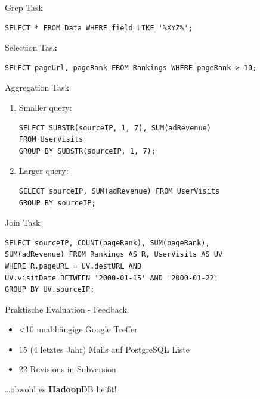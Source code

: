 \documentclass{beamer}
\begin{document}
\begin{frame}[fragile]{Grep Task}
\begin{verbatim}
SELECT * FROM Data WHERE field LIKE '%XYZ%';
\end{verbatim}
\end{frame}

\begin{frame}[fragile]{Selection Task}
\begin{verbatim}
SELECT pageUrl, pageRank FROM Rankings WHERE pageRank > 10;
\end{verbatim}
\end{frame}

\begin{frame}[fragile]{Aggregation Task}
 \begin{enumerate}
  \item Smaller query:
\begin{verbatim}
SELECT SUBSTR(sourceIP, 1, 7), SUM(adRevenue) 
FROM UserVisits 
GROUP BY SUBSTR(sourceIP, 1, 7);
\end{verbatim}

  \item Larger query:
\begin{verbatim}
SELECT sourceIP, SUM(adRevenue) FROM UserVisits 
GROUP BY sourceIP;
\end{verbatim}

  \end{enumerate}
\end{frame}

\begin{frame}[fragile]{Join Task}
\begin{verbatim}
SELECT sourceIP, COUNT(pageRank), SUM(pageRank),
SUM(adRevenue) FROM Rankings AS R, UserVisits AS UV
WHERE R.pageURL = UV.destURL AND
UV.visitDate BETWEEN '2000-01-15' AND '2000-01-22'
GROUP BY UV.sourceIP;
\end{verbatim}
\end{frame}

\begin{frame}{Praktische Evaluation - Feedback}
  \begin{itemize}
  \item \textless 10 unabhängige Google Treffer
  \item 15 (4 letztes Jahr) Mails auf PostgreSQL Liste
  \item 22 Revisions in Subversion
  \end{itemize}
  \pause
  \ldots obwohl es \textbf{Hadoop}DB heißt!
\end{frame}
\end{document}
